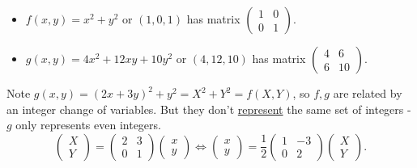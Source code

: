 \documentclass{article}
\begin{document}
\begin{eg}
    \leavevmode
    \begin{itemize}
        \item $f(x, y) = x^2 + y^2$ or $(1, 0, 1)$ has matrix
            $\begin{pmatrix}1 & 0 \\ 0 & 1\end{pmatrix}$.
        \item $g(x, y) = 4 x^2 + 12 xy + 10y^2$ or $(4, 12, 10)$ has matrix
            $\begin{pmatrix}4 & 6 \\ 6 & 10\end{pmatrix}$.
    \end{itemize}
    Note $g(x, y) = (2 x + 3 y)^2 + y^2 = X^2 + Y^2 = f(X, Y)$, so $f, g$ are related by an integer change of variables.
    But they don't \hyperlink{def:rep}{represent} the same set of integers - $g$ only represents even integers.
    \begin{equation*}
        \begin{pmatrix} X \\ Y \end{pmatrix}
        =
        \begin{pmatrix} 2 & 3 \\ 0 & 1 \end{pmatrix}
        \begin{pmatrix} x \\ y \end{pmatrix}
        \iff
        \begin{pmatrix} x \\ y \end{pmatrix}
        = \frac{1}{2}
        \begin{pmatrix} 1 & -3 \\ 0 & 2 \end{pmatrix}
        \begin{pmatrix} X \\ Y \end{pmatrix}.
    \end{equation*}
\end{eg}
\end{document}
